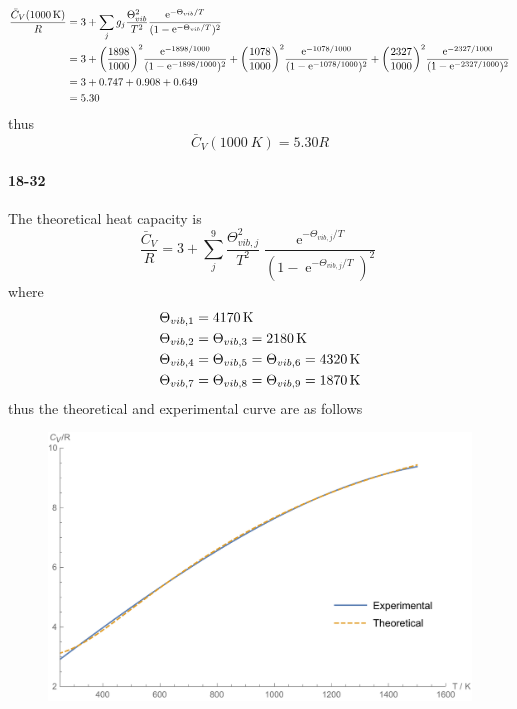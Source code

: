 \documentclass[a4paper]{article}
\DeclareMathOperator{\e}{\mathrm{e}}
\newcommand{\ex}[1]{\paragraph{18-#1}}
\numberwithin{equation}{section}
\begin{document}
\begin{align}
\dfrac{\bar{C}_V(\SI{1000}{K})}{R} &= 3 + \sum_j g_j\dfrac{\Theta_{vib}^2}{T^2}\dfrac{\e^{-\Theta_{vib} /T}}{(1 - \e^{-\Theta_{vib} /T})^2} \notag\\
&= 3 + \qty(\dfrac{1898}{1000})^2\dfrac{\e^{-1898/1000}}{(1-\e^{-1898/1000})^2} + \qty(\dfrac{1078}{1000})^2\dfrac{\e^{-1078/1000}}{(1-\e^{-1078/1000})^2} + \qty(\dfrac{2327}{1000})^2\dfrac{\e^{-2327/1000}}{(1-\e^{-2327/1000})^2} \notag\\
&= 3 + 0.747 + 0.908 + 0.649 \notag\\
&= 5.30
\end{align}
thus
\begin{equation}\label{key}
\bar{C}_V(\SI{1000}{K}) = 5.30R
\end{equation}

\newpage
\ex{32}
The theoretical heat capacity is
\begin{equation}\label{key}
\dfrac{\bar{C}_V}{R} = 3 + \sum_j^9 \dfrac{\Theta_{vib,j}^2}{T^2}\dfrac{\e^{-\Theta_{vib,j}/T}}{(1 - \e^{-\Theta_{vib,j} /T})^2}
\end{equation}
where
\begin{align}
\Theta_{vib,1} &= \SI{4170}{K} \notag\\
\Theta_{vib,2} &= \Theta_{vib,3} = \SI{2180}{K} \notag\\
\Theta_{vib,4} &= \Theta_{vib,5} = \Theta_{vib,6} = \SI{4320}{K} \notag\\
\Theta_{vib,7} &= \Theta_{vib,8} = \Theta_{vib,9} = \SI{1870}{K} 
\end{align}
thus the theoretical and experimental curve are as follows
\begin{figure}[H]
	\centering
	\includegraphics[width=0.7\linewidth]{18-32.pdf}
\end{figure}
\end{document}
